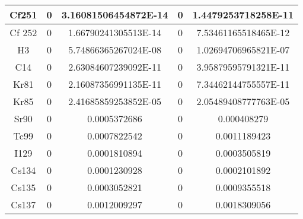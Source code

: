 \begin{table}[h]
{\begin{tabular}{|c|c|c|c|c|}
			 Cf251& 	0& 	3.16081506454872E-14& 	0& 	1.4479253718258E-11\\ \hline
			 Cf 252& 	0& 	1.66790241305513E-14& 	0& 	7.53461165518465E-12\\ \hline
			 H3& 	0& 	5.74866365267024E-08& 	0& 	1.02694706965821E-07\\ \hline
			 C14& 	0& 	2.63084607239092E-11& 	0& 	3.95879595791321E-11\\ \hline
			 Kr81& 	0& 	2.16087356991135E-11& 	0& 	7.34462144755557E-11\\ \hline
			 Kr85& 	0& 	2.41685859253852E-05& 	0& 	2.05489408777763E-05\\ \hline
			 Sr90& 	0& 	0.0005372686& 	0& 	0.000408279\\ \hline
			 Tc99& 	0& 	0.0007822542& 	0& 	0.0011189423\\ \hline
			 I129& 	0& 	0.0001810894& 	0& 	0.0003505819\\ \hline
			 Cs134& 	0& 	0.0001230928& 	0& 	0.0002101892\\ \hline
			 Cs135& 	0& 	0.0003052821& 	0& 	0.0009355518\\ \hline
			 Cs137& 	0& 	0.0012009297& 	0& 	0.0018309056\\ \hline

			 
		\end{tabular}}
\end {table}

